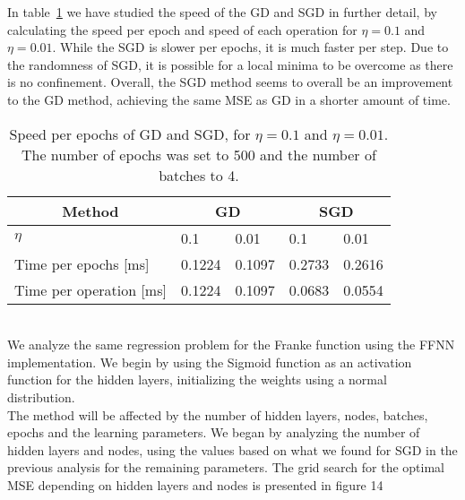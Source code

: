 \documentclass[english,notitlepage,reprint,nofootinbib]{revtex4-2}  %
\begin{document}
In table~\ref{table: a1} we have studied the speed of the GD and SGD in further detail, by calculating the speed per epoch and speed of each operation for $\eta=0.1$ and $\eta=0.01$. While the SGD is slower per epochs, it is much faster per step. 
Due to the randomness of SGD, it is possible for a local minima to be overcome as there is no confinement. Overall, the SGD method seems to overall be an improvement to the GD method, achieving the same MSE as GD in a shorter amount of time. 
\begin{table}[]
\begin{tabular}{|l|ll|ll|}
\hline
\multicolumn{1}{|c|}{\textbf{Method}} & \multicolumn{2}{c|}{GD}     & \multicolumn{2}{c|}{SGD}                       \\ \hline
$\eta$                                & \multicolumn{1}{l|}{0.1}    & 0.01   & \multicolumn{1}{l|}{0.1}     & 0.01   \\ \hline
Time per epochs [ms]                  & \multicolumn{1}{l|}{0.1224} & 0.1097 & \multicolumn{1}{l|}{0.2733}  & 0.2616 \\ \hline
Time per operation [ms]               & \multicolumn{1}{l|}{0.1224} & 0.1097 & \multicolumn{1}{l|}{0.0683}  & 0.0554 \\ \hline
\end{tabular}
\caption{Speed per epochs of GD and SGD, for $\eta=0.1$ and $\eta=0.01$. The number of epochs was set to 500 and the            number of batches to 4. }
\label{table: a1}
\end{table}
\vspace{3mm}
\\ 
We analyze the same regression problem for the Franke function using the FFNN implementation. We begin by using the Sigmoid function as an activation function for the hidden layers, initializing the weights using a normal distribution. 
\vspace{3mm}
\\ 
The method will be affected by the number of hidden layers, nodes, batches, epochs and the learning parameters. We began by analyzing the number of hidden layers and nodes, using the values based on what we found for SGD in the previous analysis for the remaining parameters. The grid search for the optimal MSE depending on hidden layers and nodes is presented in figure 14
\end{document}
